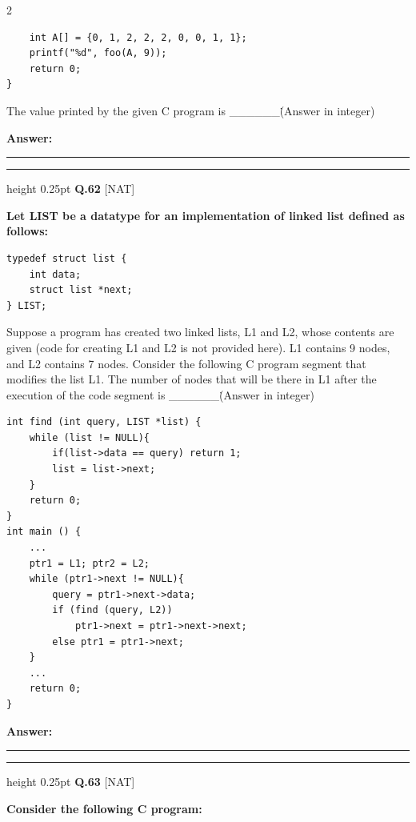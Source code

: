 \documentclass[a4paper,10pt,twoside]{article}
\begin{document}
\begin{multicols}{2}
{\begin{verbatim}
    int A[] = {0, 1, 2, 2, 2, 0, 0, 1, 1};
    printf("%d", foo(A, 9));
    return 0;
}
\end{verbatim}
The value printed by the given C program is \_\_\_\_\_\_\. (Answer in integer) \par}
\par\vspace{3pt}\noindent\textbf{Answer:} \rule{3.2cm}{0.4pt}
\par\vspace{6pt}\hrule height 0.25pt\vspace{6pt}
\noindent\textbf{Q.62} \hfill {\footnotesize\textsf{[NAT]}}
\par\vspace{2pt}
{\bfseries Let LIST be a datatype for an implementation of linked list defined as follows:
\begin{verbatim}
typedef struct list {
    int data;
    struct list *next;
} LIST;
\end{verbatim}
Suppose a program has created two linked lists, L1 and L2, whose contents are given (code for creating L1 and L2 is not provided here). L1 contains 9 nodes, and L2 contains 7 nodes.
Consider the following C program segment that modifies the list L1. The number of nodes that will be there in L1 after the execution of the code segment is \_\_\_\_\_\_\. (Answer in integer)
\par\smallskip
\begin{verbatim}
int find (int query, LIST *list) {
    while (list != NULL){
        if(list->data == query) return 1;
        list = list->next;
    }
    return 0;
}
int main () {
    ...
    ptr1 = L1; ptr2 = L2;
    while (ptr1->next != NULL){
        query = ptr1->next->data;
        if (find (query, L2))
            ptr1->next = ptr1->next->next;
        else ptr1 = ptr1->next;
    }
    ...
    return 0;
}
\end{verbatim} \par}
\par\vspace{3pt}\noindent\textbf{Answer:} \rule{3.2cm}{0.4pt}
\par\vspace{6pt}\hrule height 0.25pt\vspace{6pt}
\noindent\textbf{Q.63} \hfill {\footnotesize\textsf{[NAT]}}
\par\vspace{2pt}
{\bfseries Consider the following C program:
\par\smallskip
\begin{verbatim}

\end{verbatim}}
\end{multicols}
\end{document}
